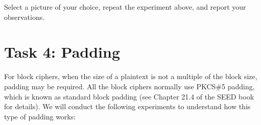 Select a  picture of your choice, repeat the experiment above, 
and report your observations. 




\section{Task 4: Padding}

For block ciphers, when the size of a plaintext is not a multiple
of the block size, padding may be required. 
All the block ciphers normally use PKCS\#5 padding, which is known 
as standard block padding (see Chapter 21.4 of the SEED book for details). 
We will conduct the following experiments to 
understand how this type of padding works:

